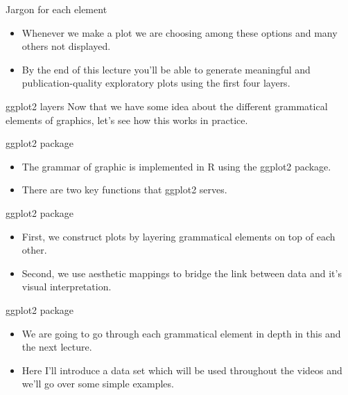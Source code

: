 \documentclass[
  ignorenonframetext,
]{beamer}
\begin{document}
\begin{frame}{Jargon for each element}
\label{jargon-for-each-element-1}
\begin{itemize}
\item
  Whenever we make a plot we are choosing among these options and many
  others not displayed.
\item
  By the end of this lecture you'll be able to generate meaningful and
  publication-quality exploratory plots using the first four layers.
\end{itemize}
\end{frame}

\begin{frame}{ggplot2 layers}
\label{ggplot2-layers}
Now that we have some idea about the different grammatical elements of
graphics, let's see how this works in practice.
\end{frame}

\begin{frame}{ggplot2 package}
\label{ggplot2-package}
\begin{itemize}
\item
  The grammar of graphic is implemented in R using the ggplot2 package.
\item
  There are two key functions that ggplot2 serves.
\end{itemize}
\end{frame}

\begin{frame}{ggplot2 package}
\label{ggplot2-package-1}
\begin{itemize}
\item
  First, we construct plots by layering grammatical elements on top of
  each other.
\item
  Second, we use aesthetic mappings to bridge the link between data and
  it's visual interpretation.
\end{itemize}
\end{frame}

\begin{frame}{ggplot2 package}
\label{ggplot2-package-2}
\begin{itemize}
\item
  We are going to go through each grammatical element in depth in this
  and the next lecture.
\item
  Here I'll introduce a data set which will be used throughout the
  videos and we'll go over some simple examples.
\end{itemize}
\end{frame}
\end{document}
